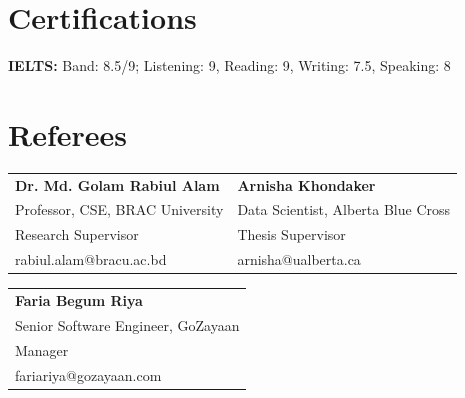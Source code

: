 \documentclass[]{resume-openfont}
\begin{document}
\section{Certifications}
\sectionsep
\begin{bullets}
    \item \textbf{IELTS:} Band: 8.5/9; Listening: 9, Reading: 9, Writing: 7.5, Speaking: 8
\end{bullets}
\sectionsep

\section{Referees}
\sectionsep

\begin{tabular}{p{}p{}}
\textbf{Dr. Md. Golam Rabiul Alam} & \textbf{Arnisha Khondaker} \\
Professor, CSE, BRAC University & Data Scientist, Alberta Blue Cross \\
Research Supervisor & Thesis Supervisor \\
rabiul.alam@bracu.ac.bd & arnisha@ualberta.ca \\
\end{tabular}

\vspace{6pt}
\begin{tabular}{p{}}
\textbf{Faria Begum Riya} \\
Senior Software Engineer, GoZayaan \\
Manager \\
fariariya@gozayaan.com \\
\end{tabular}
\end{document}

